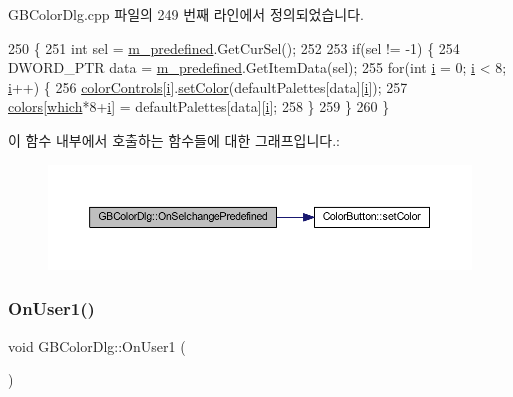 G\+B\+Color\+Dlg.\+cpp 파일의 249 번째 라인에서 정의되었습니다.


\begin{DoxyCode}
250 \{
251     \textcolor{keywordtype}{int} sel = \mbox{\hyperlink{class_g_b_color_dlg_abd7ea64ca037d12cec0615ef7872c66b}{m\_predefined}}.GetCurSel();
252 
253   \textcolor{keywordflow}{if}(sel != -1) \{
254     DWORD\_PTR data = \mbox{\hyperlink{class_g_b_color_dlg_abd7ea64ca037d12cec0615ef7872c66b}{m\_predefined}}.GetItemData(sel);
255     \textcolor{keywordflow}{for}(\textcolor{keywordtype}{int} \mbox{\hyperlink{expr-lex_8cpp_acb559820d9ca11295b4500f179ef6392}{i}} = 0; \mbox{\hyperlink{expr-lex_8cpp_acb559820d9ca11295b4500f179ef6392}{i}} < 8; \mbox{\hyperlink{expr-lex_8cpp_acb559820d9ca11295b4500f179ef6392}{i}}++) \{
256       \mbox{\hyperlink{class_g_b_color_dlg_a7b80bc0f290c7f26e84283dc7c457240}{colorControls}}[\mbox{\hyperlink{expr-lex_8cpp_acb559820d9ca11295b4500f179ef6392}{i}}].\mbox{\hyperlink{class_color_button_a9ff5dc144a4acd5e2551ab94506b3bb0}{setColor}}(defaultPalettes[data][\mbox{\hyperlink{expr-lex_8cpp_acb559820d9ca11295b4500f179ef6392}{i}}]);
257       \mbox{\hyperlink{class_g_b_color_dlg_a24de2e906e28d7b4a006d68d6c8afeee}{colors}}[\mbox{\hyperlink{class_g_b_color_dlg_a8f7bbf1c4a4ffe4a6c57454b9087ff28}{which}}*8+\mbox{\hyperlink{expr-lex_8cpp_acb559820d9ca11295b4500f179ef6392}{i}}] = defaultPalettes[data][\mbox{\hyperlink{expr-lex_8cpp_acb559820d9ca11295b4500f179ef6392}{i}}];
258     \}
259   \}
260 \}
\end{DoxyCode}
이 함수 내부에서 호출하는 함수들에 대한 그래프입니다.\+:
\nopagebreak
\begin{figure}[H]
\begin{center}
\leavevmode
\includegraphics[width=350pt]{class_g_b_color_dlg_aa2227421c4564023d2ded8198b2194d3_cgraph}
\end{center}
\end{figure}
\mbox{\label{class_g_b_color_dlg_a2648ec830505581e9268be52c4136df6}} 
\subsubsection{\texorpdfstring{On\+User1()}{OnUser1()}}
{\footnotesize\ttfamily void G\+B\+Color\+Dlg\+::\+On\+User1 (\begin{DoxyParamCaption}{ }\end{DoxyParamCaption})\hspace{0.3cm}{\ttfamily [protected]}}



